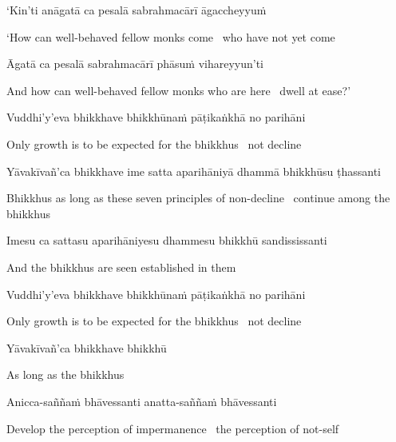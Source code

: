 `Kin'ti anāgatā ca pesalā sabrahmacārī āgaccheyyuṁ

\begin{english}
  `How can well-behaved fellow monks come \breathmark\ who have not yet come
\end{english}

Āgatā ca pesalā sabrahmacārī phāsuṁ vihareyyun'ti

\begin{english-hang}
  And how can well-behaved fellow monks who are here \breathmark\ dwell at ease?'
\end{english-hang}

Vuddhi'y'eva bhikkhave bhikkhūnaṁ pāṭikaṅkhā no parihāni

\begin{english}
  Only growth is to be expected for the bhikkhus \breathmark\ not decline
\end{english}

\begin{pali-hang}
  Yāvakīvañ'ca bhikkhave ime satta aparihāniyā dhammā bhikkhūsu ṭhassanti
\end{pali-hang}

\begin{english-hang}
  Bhikkhus as long as these seven principles of non-decline \breathmark\ continue among the bhikkhus
\end{english-hang}

Imesu ca sattasu aparihāniyesu dhammesu bhikkhū sandississanti

\begin{english}
  And the bhikkhus are seen established in them
\end{english}

Vuddhi'y'eva bhikkhave bhikkhūnaṁ pāṭikaṅkhā no parihāni

\begin{english}
  Only growth is to be expected for the bhikkhus \breathmark\ not decline
\end{english}

\suttaRef{[AN 7.23]}

Yāvakīvañ'ca bhikkhave bhikkhū

\begin{english}
  As long as the bhikkhus
\end{english}

Anicca-saññaṁ bhāvessanti anatta-saññaṁ bhāvessanti

\begin{english}
  Develop the perception of impermanence \breathmark\ the perception of not-self
\end{english}

